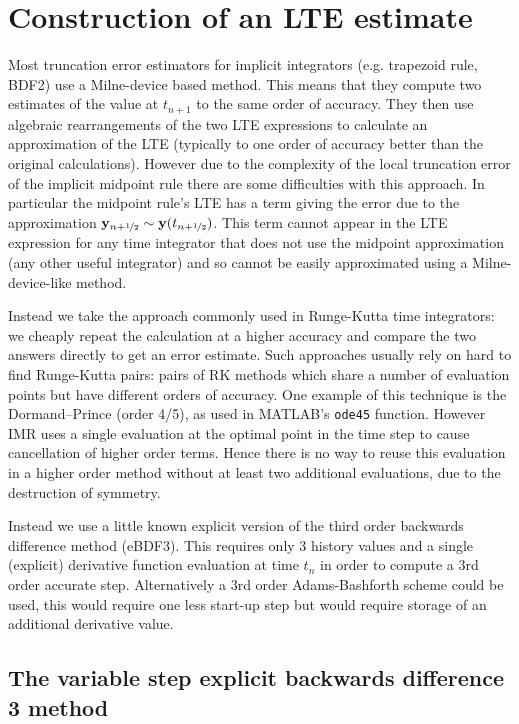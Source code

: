 \section{Construction of an LTE estimate}

Most truncation error estimators for implicit integrators (e.g. trapezoid rule, BDF2) use a Milne-device based method.\cite[pgs 707-716]{Gresho-Sani}
This means that they compute two estimates of the value at $t_{n+1}$ to the same order of accuracy.
They then use algebraic rearrangements of the two LTE expressions to calculate an approximation of the LTE (typically to one order of accuracy better than the original calculations).
However due to the complexity of the local truncation error of the implicit midpoint rule there are some difficulties with this approach.
In particular the midpoint rule's LTE has a term giving the error due to the approximation $\mathbf{y}_{n+\nicefrac{1}{2}} \sim \mathbf{y}(t_{n+\nicefrac{1}{2}})$.
This term cannot appear in the LTE expression for any time integrator that does not use the midpoint approximation (\ie any other useful integrator) and so cannot be easily approximated using a Milne-device-like method.

Instead we take the approach commonly used in Runge-Kutta time integrators: we cheaply repeat the calculation at a higher accuracy and compare the two answers directly to get an error estimate.
Such approaches usually rely on hard to find Runge-Kutta pairs: pairs of RK methods which share a number of evaluation points but have different orders of accuracy.
One example of this technique is the Dormand–Prince (order 4/5), as used in MATLAB's \texttt{ode45} function.
However IMR uses a single evaluation at the optimal point in the time step to cause cancellation of higher order terms.
Hence there is no way to reuse this evaluation in a higher order method without at least two additional evaluations, due to the destruction of symmetry.

Instead we use a little known explicit version of the third order backwards difference method (eBDF3).
This requires only 3 history values and a single (explicit) derivative function evaluation at time $t_n$ in order to compute a 3rd order accurate step.
Alternatively a 3rd order Adams-Bashforth scheme could be used, this would require one less start-up step but would require storage of an additional derivative value.

\subsection{The variable step explicit backwards difference 3 method}

